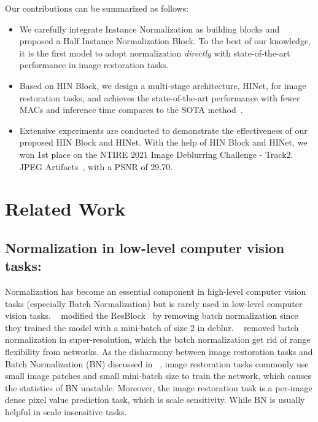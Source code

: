 \documentclass[final]{cvpr}
\begin{document}
Our contributions can be summarized as follows:
\begin{itemize}
   \item We carefully integrate Instance Normalization as building blocks and proposed a Half Instance Normalization Block. To the best of our knowledge, it is the first model to adopt normalization \emph{directly} with state-of-the-art performance in image restoration tasks.
   \item Based on HIN Block, we design a multi-stage architecture, HINet, for image restoration tasks, and achieves the state-of-the-art performance with fewer MACs and inference time compares to the SOTA method~\cite{zamir2021multi}.
   \item Extensive experiments are conducted to demonstrate the effectiveness of our proposed HIN Block and HINet. With the help of HIN Block and HINet, we won 1st place on the NTIRE 2021 Image Deblurring Challenge - Track2. JPEG Artifacts~\cite{nah2021ntire}, with a PSNR of 29.70.
\end{itemize}

\section{Related Work}


\subsection{Normalization in low-level computer vision tasks:}
Normalization has become an essential component in high-level computer vision tasks (especially Batch Normalization) but is rarely used in low-level computer vision tasks. ~\cite{nah2017deep} modified the ResBlock~\cite{he2016deep} by removing batch normalization since they trained the model with a mini-batch of size 2 in deblur. ~\cite{lim2017enhanced} removed batch normalization in super-resolution, which the batch normalization get rid of range flexibility from networks.  As the disharmony between image restoration tasks and Batch Normalization (BN) discussed in ~\cite{yu2018wide}, image restoration tasks commonly use small image patches and small mini-batch size to train the network, which causes the statistics of BN unstable. Moreover, the image restoration task is a per-image dense pixel value prediction task, which is scale sensitivity. While BN is usually helpful in scale insensitive tasks. 
\end{document}
